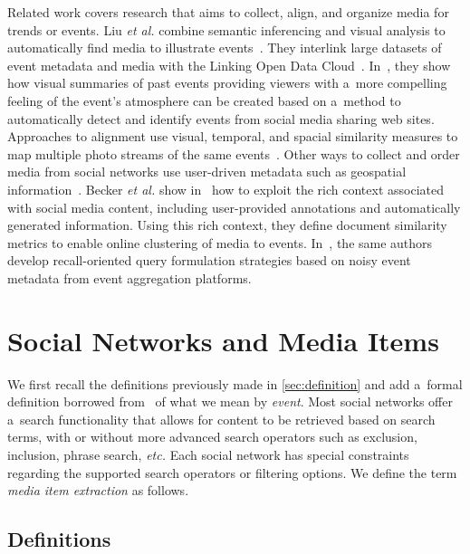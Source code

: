 Related work covers research
that aims to collect, align, and organize media
for trends or events.
Liu \emph{et al.} combine semantic inferencing and visual analysis
to automatically find media to illustrate
events~\cite{liu2011events}.
They interlink large datasets of event metadata
and media with the Linking Open Data
Cloud~\cite{bizer2011statelodcloud,cyganiak2011lodcloud}.
In~\cite{liu2011socialmedia}, they show how visual summaries
of past events providing viewers with a~more compelling feeling
of the event's atmosphere can be created
based on a~method to automatically detect and identify events
from social media sharing web sites.
Approaches to alignment use visual, temporal,
and spacial similarity measures to map multiple photo streams of
the same events~\cite{yang2011photostream}.
Other ways to collect and order media from social networks use
user-driven metadata such as geospatial
information~\cite{crandall2009mappingphotos}.
Becker \emph{et al.} show in~\cite{becker2010eventidentification}
how to exploit the rich context associated with social media
content, including user-provided annotations
and automatically generated information.
Using this rich context, they define document similarity metrics
to enable online clustering of media to events.
In~\cite{becker2012plannedevents}, the same authors develop 
recall-oriented query formulation strategies
based on noisy event metadata
from event aggregation platforms.

\section{Social Networks and Media Items}                                    \label{sec:social-networks}

We first recall the definitions previously made in
\autoref{sec:definition} and add a~formal definition
borrowed from~\cite{liu2011events}
of what we mean by \emph{event}.
Most social networks offer a~search functionality that allows for
content to be retrieved based on search terms,
with or without more advanced search operators
such as exclusion, inclusion, phrase search, \emph{etc.}
Each social network has special constraints
regarding the supported search operators or filtering options.
We define the term \emph{media item extraction}
as follows.

\subsection{Definitions}

